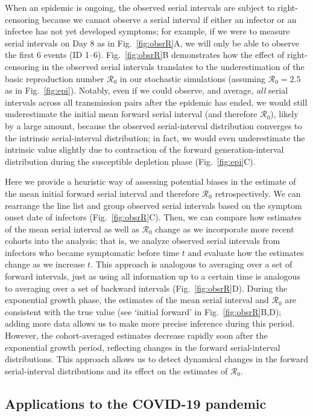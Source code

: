 \documentclass[12pt]{article}
\newcommand{\fref}[1]{Fig.~\ref{fig:#1}}
\newcommand{\Rx}[1]{\ensuremath{{\mathcal R}_{#1}}\xspace}
\newcommand{\Ro}{\Rx{0}}
\begin{document}
When an epidemic is ongoing, the observed serial intervals are subject to right-censoring because we cannot observe a serial interval if either an infector or an infectee has not yet developed symptoms;
for example, if we were to measure serial intervals on Day 8 as in \fref{obsrR}A, we will only be able to observe the first 6 events (ID 1--6).
\fref{obsrR}B demonstrates how the effect of right-censoring in the observed serial intervals translates to the underestimation of the basic reproduction number \Ro in our stochastic simulations (assuming $\Ro = 2.5$ as in \fref{epi}).
Notably, even if we could observe, and average, \emph{all} serial intervals across all transmission pairs after the epidemic has ended, we would still underestimate the initial mean forward serial interval (and therefore \Ro), likely by a large amount, because the observed serial-interval distribution converges to the intrinsic serial-interval distribution;
in fact, we would even underestimate the intrinsic value slightly due to contraction of the forward generation-interval distribution during the susceptible depletion phase (\fref{epi}C).

Here we provide a heuristic way of assessing potential biases in the estimate of the mean initial forward serial interval and therefore \Ro retrospectively.
We can rearrange the line list and group observed serial intervals based on the symptom onset date of infectors (\fref{obsrR}C).
Then, we can compare how estimates of the mean serial interval as well as \Ro change as we incorporate more recent cohorts into the analysis;
that is, we analyze observed serial intervals from infectors who became symptomatic before time $t$ and evaluate how the estimates change as we increase $t$.
This approach is analogous to averaging over a set of forward intervals, just as using all information up to a certain time is analogous to averaging over a set of backward intervals (\fref{obsrR}D).
During the exponential growth phase, the estimates of the mean serial interval and \Ro are consistent with the true value (see `initial forward' in \fref{obsrR}B,D);
adding more data allows us to make more precise inference during this period.
However, the cohort-averaged estimates decrease rapidly soon after the exponential growth period, reflecting changes in the forward serial-interval distributions.
This approach allows us to detect dynamical changes in the forward serial-interval distributions and its effect on the estimates of \Ro.

\subsection{Applications to the COVID-19 pandemic}
\end{document}
